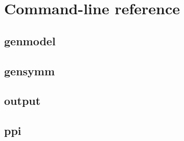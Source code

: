 \chapter{Command-line reference}
\label{Chapter: Reference}

\section{genmodel}
{\small
}

\clearpage
\section{gensymm}
{\small
}

\clearpage
\section{output}
{\small
}

\clearpage
\section{ppi}
{\small
}



